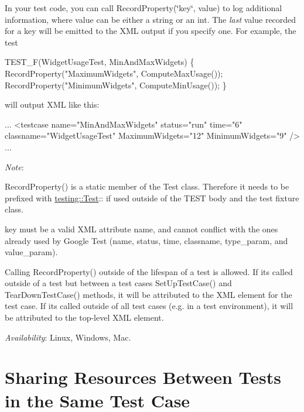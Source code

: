 In your test code, you can call {\ttfamily Record\+Property(\char`\"{}key\char`\"{}, value)} to log additional information, where {\ttfamily value} can be either a string or an {\ttfamily int}. The {\itshape last} value recorded for a key will be emitted to the X\+ML output if you specify one. For example, the test


\begin{DoxyCode}
TEST\_F(WidgetUsageTest, MinAndMaxWidgets) \{
  RecordProperty("MaximumWidgets", ComputeMaxUsage());
  RecordProperty("MinimumWidgets", ComputeMinUsage());
\}
\end{DoxyCode}


will output X\+ML like this\+:


\begin{DoxyCode}
...
  <testcase name="MinAndMaxWidgets" status="run" time="6" classname="WidgetUsageTest"
            MaximumWidgets="12"
            MinimumWidgets="9" />
...
\end{DoxyCode}


{\itshape Note}\+:
\begin{DoxyItemize}
\item {\ttfamily Record\+Property()} is a static member of the {\ttfamily Test} class. Therefore it needs to be prefixed with {\ttfamily \hyperlink{classtesting_1_1_test}{testing\+::\+Test}\+:\+:} if used outside of the {\ttfamily T\+E\+ST} body and the test fixture class.
\item {\ttfamily key} must be a valid X\+ML attribute name, and cannot conflict with the ones already used by Google Test ({\ttfamily name}, {\ttfamily status}, {\ttfamily time}, {\ttfamily classname}, {\ttfamily type\+\_\+param}, and {\ttfamily value\+\_\+param}).
\item Calling {\ttfamily Record\+Property()} outside of the lifespan of a test is allowed. If it\textquotesingle{}s called outside of a test but between a test case\textquotesingle{}s {\ttfamily Set\+Up\+Test\+Case()} and {\ttfamily Tear\+Down\+Test\+Case()} methods, it will be attributed to the X\+ML element for the test case. If it\textquotesingle{}s called outside of all test cases (e.\+g. in a test environment), it will be attributed to the top-\/level X\+ML element.
\end{DoxyItemize}

{\itshape Availability}\+: Linux, Windows, Mac.

\section*{Sharing Resources Between Tests in the Same Test Case}

